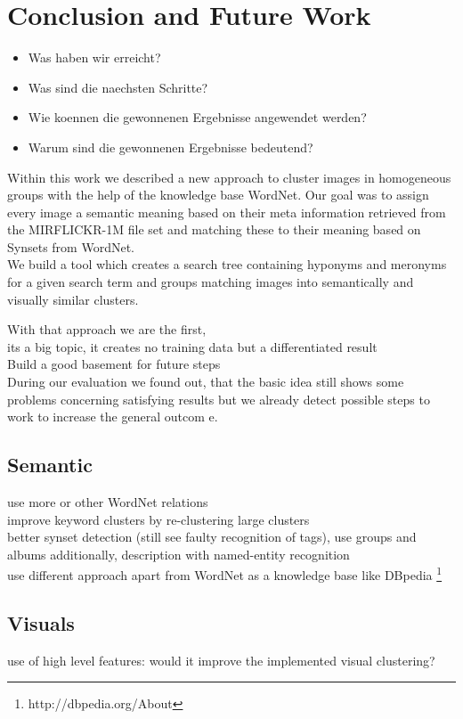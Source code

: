 %
\section{Conclusion and Future Work}
\label{sec_future}

\begin{itemize}
\item Was haben wir erreicht?
\item Was sind die naechsten Schritte?
\item Wie koennen die gewonnenen Ergebnisse angewendet werden?
\item Warum sind die gewonnenen Ergebnisse bedeutend?
\end{itemize}

Within this work we described a new approach to cluster images in homogeneous groups with the help of the knowledge base WordNet. Our goal was to assign every image a semantic meaning based on their meta information retrieved from the MIRFLICKR-1M file set and matching these to their meaning based on Synsets from WordNet. \\
We build a tool which creates a search tree containing hyponyms and meronyms for a given search term and groups matching images into semantically and visually similar clusters. 

\bigskip
With that approach we are the first, \\
its a big topic, it creates no training data but a differentiated result \\
Build a good basement for future steps \\

During our evaluation we found out, that the basic idea still shows some problems concerning satisfying results but we already detect possible steps to work to increase the general outcom
e. 

\subsection{Semantic}
use more or other WordNet relations\\
improve keyword clusters by re-clustering large clusters\\
better synset detection (still see faulty recognition of tags), use groups and albums additionally, description with named-entity recognition \\
use different approach apart from WordNet as a knowledge base like DBpedia \footnote{http://dbpedia.org/About}

\subsection{Visuals}

use of high level features: would it improve the implemented visual clustering?
